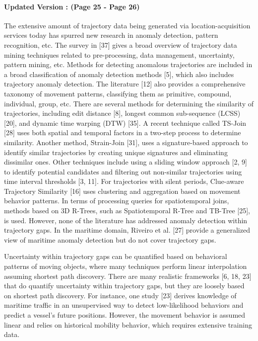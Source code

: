 \documentclass[twoside,leqno,onecolumn]{article}
\begin{document}
\paragraph{Updated Version : (Page 25 - Page 26)\\} The extensive amount of trajectory data being generated via location-acquisition services today has spurred new research in anomaly detection, pattern recognition, etc. The survey in [37] gives a broad overview of trajectory data mining techniques related to pre-processing, data management, uncertainty, pattern mining, etc. Methods for detecting anomalous trajectories are included in a broad classification of anomaly detection methods [5], which also includes trajectory anomaly detection. The literature [12] also provides a comprehensive taxonomy of movement patterns, classifying them as primitive, compound, individual, group, etc. There are several methods for determining the similarity of trajectories, including edit distance [8], longest common sub-sequence (LCSS) [20], and dynamic time warping (DTW) [35]. A recent technique called TS-Join [28] uses both spatial and temporal factors in a two-step process to determine similarity. Another method, Strain-Join [31], uses a signature-based approach to identify similar trajectories by creating unique signatures and eliminating dissimilar ones. Other techniques include using a sliding window approach [2, 9] to identify potential candidates and filtering out non-similar trajectories using time interval thresholds [3, 11]. For trajectories with silent periods, Clue-aware Trajectory Similarity [16] uses clustering and aggregation based on movement behavior patterns. In terms of processing queries for spatiotemporal joins, methods based on 3D R-Trees, such as Spatiotemporal R-Tree and TB-Tree [25], is used. However, none of the literature has addressed anomaly detection within trajectory gaps. In the maritime domain, Riveiro et al. [27] provide a generalized view of maritime anomaly detection but do not cover trajectory gaps.

Uncertainty within trajectory gaps can be quantified based on behavioral patterns of moving objects, where many techniques perform linear interpolation assuming shortest path discovery. There are many realistic frameworks [6, 18, 23] that do quantify uncertainty within trajectory gaps, but they are loosely based on shortest path discovery. For instance, one study [23] derives knowledge of maritime traffic in an unsupervised way to detect low-likelihood behaviors and predict a vessel's future positions. However, the movement behavior is assumed linear and relies on historical mobility behavior, which requires extensive training data. 
\end{document}
